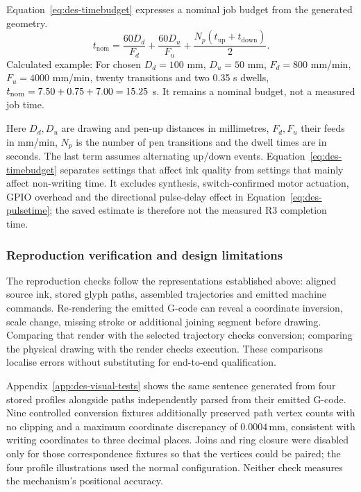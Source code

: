 Equation~\ref{eq:des-timebudget} expresses a nominal job budget from the generated geometry.
\begin{equation}
t_{\mathrm{nom}}=\frac{60D_d}{F_d}+\frac{60D_u}{F_u}
+\frac{N_p(t_{\mathrm{up}}+t_{\mathrm{down}})}{2}.
\label{eq:des-timebudget}
\end{equation}
Calculated example: For chosen $D_d=100$ mm, $D_u=50$ mm, $F_d=800$ mm/min, $F_u=4000$ mm/min, twenty transitions and two 0.35 s dwells, $t_{\rm nom}=7.50+0.75+7.00=15.25$ s. It remains a nominal budget, not a measured job time. \cite[reproduce.py, WriteGcode]{braunepipeline2026}

Here $D_d,D_u$ are drawing and pen-up distances in millimetres, $F_d,F_u$ their feeds in mm/min, $N_p$ is the number of pen transitions and the dwell times are in seconds. The last term assumes alternating up/down events. Equation~\ref{eq:des-timebudget} separates settings that affect ink quality from settings that mainly affect non-writing time. It excludes synthesis, switch-confirmed motor actuation, GPIO overhead and the directional pulse-delay effect in Equation~\ref{eq:des-pulsetime}; the saved estimate is therefore not the measured R3 completion time.~\cite[style.py; synthesise.py; reproduce.py]{braunepipeline2026}

\subsubsection{Reproduction verification and design limitations}
The reproduction checks follow the representations established above: aligned source ink, stored glyph paths, assembled trajectories and emitted machine commands. Re-rendering the emitted G-code can reveal a coordinate inversion, scale change, missing stroke or additional joining segment before drawing. Comparing that render with the selected trajectory checks conversion; comparing the physical drawing with the render checks execution. These comparisons localise errors without substituting for end-to-end qualification.~\cite[style.py; synthesise.py; reproduce.py]{braunepipeline2026}


Appendix~\ref{app:des-visual-tests} shows the same sentence generated from four stored profiles alongside paths independently parsed from their emitted G-code. Nine controlled conversion fixtures additionally preserved path vertex counts with no clipping and a maximum coordinate discrepancy of $0.0004$\,mm, consistent with writing coordinates to three decimal places. Joins and ring closure were disabled only for those correspondence fixtures so that the vertices could be paired; the four profile illustrations used the normal configuration. Neither check measures the mechanism's positional accuracy.~\cite[style.py; synthesise.py; reproduce.py]{braunepipeline2026}


